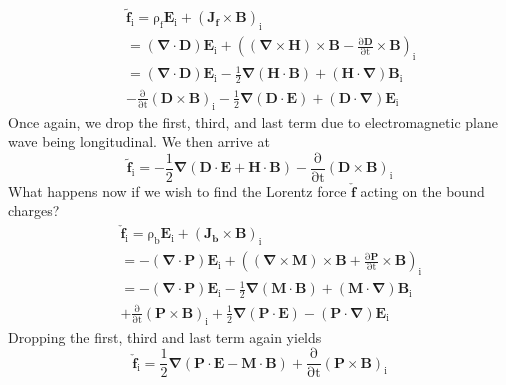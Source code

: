 \documentclass[twocolumn,english,pra,aps,superscriptaddress,floatfix]{revtex4-1}
\begin{document}
\begin{eqnarray}
&&\mathrm{\tilde{\mathbf{f}}_i=\rho_f \mathbf{E}_i+\left(\mathbf{J_f} \times \mathbf{B}\right)_i}\nonumber \\
&&=\mathrm{\left(\mathbf{\nabla} \cdot \mathbf{D}\right)\mathbf{E}_i+\left(\left(\mathbf{\nabla}\times \mathbf{H}\right)\times\mathbf{B}-\frac{\partial \mathbf{D}}{\partial t} \times \mathbf{B}\right)_i} \nonumber \\
&&\mathrm{=\left(\mathbf{\nabla} \cdot \mathbf{D}\right)\mathbf{E}_i-\frac{1}{2}\mathbf{\nabla}\left(\mathbf{H}\cdot\mathbf{B}\right)+\left(\mathbf{H}\cdot\mathbf{\nabla}\right)\mathbf{B}_i} \nonumber \\
&&\mathrm{-\frac{\partial}{\partial t} \left(\mathbf{D}\times \mathbf{B}\right)_i-\frac{1}{2}\mathbf{\nabla}\left(\mathbf{D}\cdot\mathbf{E}\right)+\left(\mathbf{D}\cdot\mathbf{\nabla}\right)\mathbf{E}_i}
\end{eqnarray}
Once again, we drop the first, third, and last term due to electromagnetic plane wave being longitudinal.  We then arrive at
\begin{equation}
\mathrm{\tilde{\mathbf{f}}_i=-\frac{1}{2}\mathbf{\nabla}\left(\mathbf{D}\cdot\mathbf{E}+\mathbf{H}\cdot\mathbf{B}\right)-\frac{\partial}{\partial t} \left(\mathbf{D}\times \mathbf{B}\right)_i}
\end{equation}
What happens now if we wish to find the Lorentz force $\check{\mathbf{f}}$ acting on the bound charges?  
\begin{eqnarray}
&&\mathrm{\check{\mathbf{f}}_i=\rho_b \mathbf{E}_i+\left(\mathbf{J_b} \times \mathbf{B}\right)_i}\nonumber \\
&&=-\mathrm{\left(\mathbf{\nabla} \cdot \mathbf{P}\right)\mathbf{E}_i+\left(\left(\mathbf{\nabla}\times \mathbf{M}\right)\times\mathbf{B}+\frac{\partial \mathbf{P}}{\partial t} \times \mathbf{B}\right)_i} \nonumber \\
&&\mathrm{=-\left(\mathbf{\nabla} \cdot \mathbf{P}\right)\mathbf{E}_i-\frac{1}{2}\mathbf{\nabla}\left(\mathbf{M}\cdot\mathbf{B}\right)+\left(\mathbf{M}\cdot\mathbf{\nabla}\right)\mathbf{B}_i} \nonumber \\
&&\mathrm{+\frac{\partial}{\partial t} \left(\mathbf{P}\times \mathbf{B}\right)_i+\frac{1}{2}\mathbf{\nabla}\left(\mathbf{P}\cdot\mathbf{E}\right)-\left(\mathbf{P}\cdot\mathbf{\nabla}\right)\mathbf{E}_i}
\end{eqnarray}
Dropping the first, third and last term again yields
\begin{equation}
\mathrm{\check{\mathbf{f}}_i=\frac{1}{2}\mathbf{\nabla}\left(\mathbf{P}\cdot\mathbf{E}-\mathbf{M}\cdot\mathbf{B}\right)+\frac{\partial}{\partial t} \left(\mathbf{P}\times \mathbf{B}\right)_i}
\end{equation}
\end{document}

